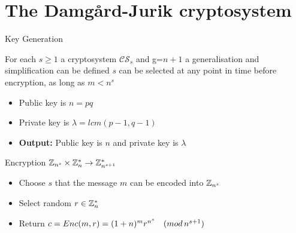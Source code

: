 \documentclass{beamer}
\begin{document}
\section{The Damg{\aa}rd-Jurik cryptosystem \cite{Damgard2001}}
\frame{\sectionpage}
\begin{frame}[allowframebreaks]{Key Generation}

For each $s \geq 1$ a cryptosystem $\mathcal{CS}_s$ and g=$n+1$ a generalisation and simplification can be defined
$s$ can be selected at any point in time before encryption, as long as $ m < n^s$ 

\begin{itemize}
\item Public key is $n=pq$
\item Private key is $\lambda = lcm (p-1, q-1)$
\item \textbf{Output:} Public key is $n$ and private key is $\lambda$ 
\end{itemize}

\end{frame}

\begin{frame}{Encryption $\mathbb{Z}_{n^s} \times \mathbb{Z}_{n}^* \rightarrow \mathbb{Z}_{n^{s+1}}^*$}
\begin{itemize}
\item Choose $s$ that the message $m$ can be encoded into $\mathbb{Z}_{n^s}$
\item Select random $r \in \mathbb{Z}_{n}^*$
\item Return $c = Enc(m,r) = (1+n)^m  r^{n^s} \quad (mod \, {n^{s+1}})  $
\end{itemize}
\end{frame}
\end{document}
